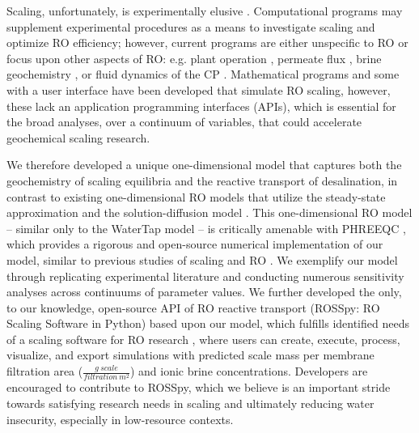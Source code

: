 Scaling, unfortunately, is experimentally elusive \cite{Hu2014Real-timeSpectroscopy,Butt1995IdentificationAutopsy,Sheikholeslami2003KineticsM}. Computational programs \cite{Giere2009IsExperimentation,Wijmans1995TheReview} may supplement experimental procedures \cite{Lenhard2007ComputerModeling,Chai2007UltrasoundModules} as a means to investigate scaling and optimize RO efficiency; however, current programs are either unspecific to RO \cite{2018ZeroPHREEQC} or focus upon other aspects of RO: e.g. plant operation \cite{DesalitechROSASoftware,Chee2018PerformanceSoftware,SysCAD2020PHREEQCUnit,Bouchareb2019ExperimentalDesalination}, permeate flux \cite{Xu2012TOUGHREACT.0,Steefel2015ReactiveSimulation}, brine geochemistry \cite{Kundu2018TechnicalTechnology}, or fluid dynamics of the CP \cite{Walker2003AssessmentReaction}. Mathematical programs \cite{Radu2014ASystems,Karabelas2019PredictionSimulator} and some with a user interface \cite{SoftwareReverseOsmosis,Strubbe2018CalibrationFull-Scale} have been developed that simulate RO scaling, however, these lack an application programming interfaces (APIs), which is essential for the broad analyses, over a continuum of variables, that could accelerate geochemical scaling research. 

We therefore developed a unique one-dimensional model that captures both the geochemistry of scaling equilibria and the reactive transport of desalination, in contrast to existing one-dimensional RO models that utilize the steady-state approximation and the solution-diffusion model \cite{Strubbe2018CalibrationFull-Scale}. This one-dimensional RO model -- similar only to the WaterTap model \cite{NAWI2021WaterTap} -- is critically amenable with PHREEQC \cite{Parkhurst2015PhreeqcRM:PHREEQC,Charlton2011ModulesLanguages}, which provides a rigorous and open-source numerical implementation of our model, similar to previous studies of scaling \cite{Mitrouli2016CalciumExperiments,Warsinger2018InorganicOsmosis} and RO \cite{Bein1993OriginBrine,Wilson1993GeochemistryFormations,Casas2012SeawaterElectrodialysis,Yan2017ReverseVelocity}. We exemplify our model through replicating experimental literature and conducting numerous sensitivity analyses across continuums of parameter values. We further developed the only, to our knowledge, open-source API of RO reactive transport (ROSSpy: RO Scaling Software in Python) based upon our model, which fulfills identified needs of a scaling software for RO research \cite{Karabelas2020ScalingTools}, where users can create, execute, process, visualize, and export simulations with predicted scale mass per membrane filtration area ($\frac{g~scale}{filtration~m^2}$) and ionic brine concentrations. Developers are encouraged to contribute to ROSSpy, which we believe is an important stride towards satisfying research needs in scaling and ultimately reducing water insecurity, especially in low-resource contexts. 

